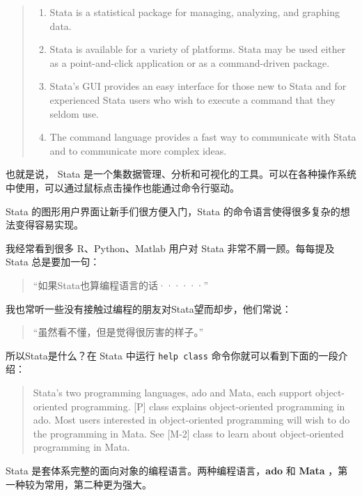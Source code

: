 \documentclass[]{ctexbook}
\providecommand{\tightlist}{%
  \setlength{\itemsep}{0pt}\setlength{\parskip}{0pt}}
\begin{document}
\begin{quote}
\begin{enumerate}
\def\labelenumi{\arabic{enumi}.}
\tightlist
\item
  Stata is a statistical package for managing, analyzing, and graphing data.
\item
  Stata is available for a variety of platforms. Stata may be used either as a point-and-click application or as a command-driven package.
\item
  Stata's GUI provides an easy interface for those new to Stata and for experienced Stata users who
  wish to execute a command that they seldom use.
\item
  The command language provides a fast way to communicate with Stata and to communicate more complex ideas.
\end{enumerate}
\end{quote}

也就是说， Stata 是一个集数据管理、分析和可视化的工具。可以在各种操作系统中使用，可以通过鼠标点击操作也能通过命令行驱动。

Stata 的图形用户界面让新手们很方便入门，Stata 的命令语言使得很多复杂的想法变得容易实现。

我经常看到很多 R、Python、Matlab 用户对 Stata 非常不屑一顾。每每提及 Stata 总是要加一句：

\begin{quote}
``如果Stata也算编程语言的话······''
\end{quote}

我也常听一些没有接触过编程的朋友对Stata望而却步，他们常说：

\begin{quote}
``虽然看不懂，但是觉得很厉害的样子。''
\end{quote}

所以Stata是什么？在 Stata 中运行 \texttt{help\ class} 命令你就可以看到下面的一段介绍：

\begin{quote}
Stata's two programming languages, ado and Mata, each support object-oriented programming. {[}P{]} class explains object-oriented programming in ado. Most users interested in object-oriented programming will wish to do the programming in Mata. See {[}M-2{]} class to learn about object-oriented programming in Mata.
\end{quote}

Stata 是套体系完整的面向对象的编程语言。两种编程语言，\textbf{ado} 和 \textbf{Mata} ，第一种较为常用，第二种更为强大。
\end{document}
